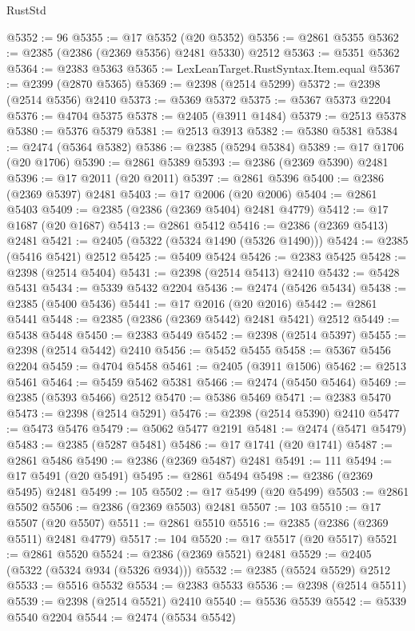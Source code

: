 \begin{lexlean}{RustStd}
\begin{coremodule}
{\begin{coremodule}
{{{{{{{{{{{{{{{{{{{{{{{{{{{{{{{{{{{{{{{{{{{{{{{{{{@5352 := 96
@5355 := @17 @5352 (@20 @5352)
@5356 := @2861 @5355
@5362 := @2385 (@2386 (@2369 @5356) @2481 @5330) @2512
@5363 := @5351 @5362
@5364 := @2383 @5363
@5365 := LexLeanTarget.RustSyntax.Item.equal
@5367 := @2399 (@2870 @5365)
@5369 := @2398 (@2514 @5299)
@5372 := @2398 (@2514 @5356) @2410
@5373 := @5369 @5372
@5375 := @5367 @5373 @2204
@5376 := @4704 @5375
@5378 := @2405 (@3911 @1484)
@5379 := @2513 @5378
@5380 := @5376 @5379
@5381 := @2513 @3913
@5382 := @5380 @5381
@5384 := @2474 (@5364 @5382)
@5386 := @2385 (@5294 @5384)
@5389 := @17 @1706 (@20 @1706)
@5390 := @2861 @5389
@5393 := @2386 (@2369 @5390) @2481
@5396 := @17 @2011 (@20 @2011)
@5397 := @2861 @5396
@5400 := @2386 (@2369 @5397) @2481
@5403 := @17 @2006 (@20 @2006)
@5404 := @2861 @5403
@5409 := @2385 (@2386 (@2369 @5404) @2481 @4779)
@5412 := @17 @1687 (@20 @1687)
@5413 := @2861 @5412
@5416 := @2386 (@2369 @5413) @2481
@5421 := @2405 (@5322 (@5324 @1490 (@5326 @1490)))
@5424 := @2385 (@5416 @5421) @2512
@5425 := @5409 @5424
@5426 := @2383 @5425
@5428 := @2398 (@2514 @5404)
@5431 := @2398 (@2514 @5413) @2410
@5432 := @5428 @5431
@5434 := @5339 @5432 @2204
@5436 := @2474 (@5426 @5434)
@5438 := @2385 (@5400 @5436)
@5441 := @17 @2016 (@20 @2016)
@5442 := @2861 @5441
@5448 := @2385 (@2386 (@2369 @5442) @2481 @5421) @2512
@5449 := @5438 @5448
@5450 := @2383 @5449
@5452 := @2398 (@2514 @5397)
@5455 := @2398 (@2514 @5442) @2410
@5456 := @5452 @5455
@5458 := @5367 @5456 @2204
@5459 := @4704 @5458
@5461 := @2405 (@3911 @1506)
@5462 := @2513 @5461
@5464 := @5459 @5462 @5381
@5466 := @2474 (@5450 @5464)
@5469 := @2385 (@5393 @5466) @2512
@5470 := @5386 @5469
@5471 := @2383 @5470
@5473 := @2398 (@2514 @5291)
@5476 := @2398 (@2514 @5390) @2410
@5477 := @5473 @5476
@5479 := @5062 @5477 @2191
@5481 := @2474 (@5471 @5479)
@5483 := @2385 (@5287 @5481)
@5486 := @17 @1741 (@20 @1741)
@5487 := @2861 @5486
@5490 := @2386 (@2369 @5487) @2481
@5491 := 111
@5494 := @17 @5491 (@20 @5491)
@5495 := @2861 @5494
@5498 := @2386 (@2369 @5495) @2481
@5499 := 105
@5502 := @17 @5499 (@20 @5499)
@5503 := @2861 @5502
@5506 := @2386 (@2369 @5503) @2481
@5507 := 103
@5510 := @17 @5507 (@20 @5507)
@5511 := @2861 @5510
@5516 := @2385 (@2386 (@2369 @5511) @2481 @4779)
@5517 := 104
@5520 := @17 @5517 (@20 @5517)
@5521 := @2861 @5520
@5524 := @2386 (@2369 @5521) @2481
@5529 := @2405 (@5322 (@5324 @934 (@5326 @934)))
@5532 := @2385 (@5524 @5529) @2512
@5533 := @5516 @5532
@5534 := @2383 @5533
@5536 := @2398 (@2514 @5511)
@5539 := @2398 (@2514 @5521) @2410
@5540 := @5536 @5539
@5542 := @5339 @5540 @2204
@5544 := @2474 (@5534 @5542)
}}}}}}}}}}}}}}}}}}}}}}}}}}}}}}}}}}}}}}}}}}}}}}}}}}
\end{coremodule}}
\end{coremodule}
\end{lexlean}

